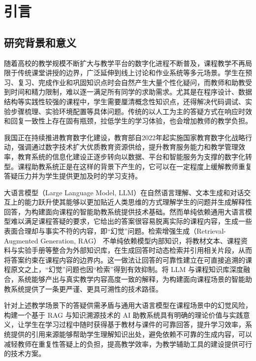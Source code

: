 \chapter{引言}

\section{研究背景和意义}
随着高校的教学规模不断扩大与教学平台的数字化进程不断普及，课程教学不再局限于传统课堂讲授的边界，广泛延伸到线上讨论和作业系统等多元场景\cite{zawacki2019systematic}。学生在预习、复习、完成作业和巩固知识点时会自然产生大量个性化疑问，而教师和助教受到时间和精力限制，难以逐一满足所有同学的求助需求。尤其是在程序设计、数据结构等实践性较强的课程中，学生需要厘清概念性知识点，还得解决代码调试、实验步骤梳理、实验环境配置等具体问题。传统的以人工为主的答疑方式在响应时效和回复一致性上存在固有瓶颈，拉低学生的学习体验，也会增加教师的教学负担。

我国正在持续推进教育数字化建设，教育部自2022年起实施国家教育数字化战略行动，强调通过数字技术扩大优质教育资源供给，提升教育服务能力和教学管理效率，教育系统的信息化建设正逐步转向以数据、平台和智能服务为支撑的数字化转型\cite{2022教育部2022年工作要点部署实施教育数字化战略行动}。课程助教系统正是在这样的背景下产生的，它可以在一定程度上缓解教师重复答疑压力并为学生提供更加及时的学习支持。

大语言模型（Large Language Model, LLM）在自然语言理解、文本生成和对话交互上的能力跃升使其能够以更加贴近人类思维的方式理解学生的问题并生成解释性回答，为构建面向课程的智能助教系统提供技术基础。然而单纯依赖通用大语言模型难以满足课程答疑的要求，它给出的答案很容易脱离实际的课程内容，生成一些表面合理却与事实不符的内容，即“幻觉”问题\cite{ji2023survey}。检索增强生成（Retrieval-Augmented Generation, RAG）\cite{lewis2020retrieval} 不单纯依赖模型内部知识，将教材文本、课程资料与实验手册等整合为外部知识库，在生成回答时动态检索并引用相关片段，从而将答案约束在课程内容的边界内。这一做法让回答的可靠性建立在可直接追溯的课程原文之上，“幻觉”问题也因“检索”得到有效抑制。将 LLM 与课程知识库深度融合，系统能够产出与真实教学内容高度一致的解释，为构建面向课程场景的智能助教系统提供了一条更严谨、更具可溯性的技术路径。

针对上述教学场景下的答疑供需矛盾与通用大语言模型在课程场景中的幻觉风险，构建一个基于 RAG 与知识溯源技术的 AI 助教系统具有明确的理论价值与实践意义，让学生在学习过程中随时获得基于教材与课件的可靠回答，提升学习效率，系统提供的引用来源能够帮助学生理解知识出处，避免依赖不可靠的生成内容，可以减轻教师在重复性答疑上的负担，提高教学效率，为教学辅助工具的建设提供可行的技术方案。 

